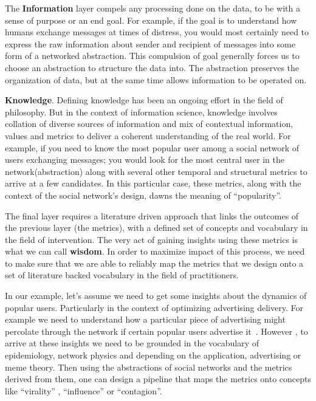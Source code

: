 The \textbf{Information} layer compels any processing done on the data, to be with a sense of purpose or an end goal. For example, if the goal is to understand how humans exchange messages at times of distress, you would most certainly need to express the raw information about sender and recipient of messages into some form of a networked abstraction. This compulsion of goal generally forces us to choose an abstraction to structure the data into. The abstraction preserves the organization of data, but at the same time allows information to be operated on.  

\textbf{Knowledge}. Defining knowledge has been an ongoing effort in the field of philosophy. But in the context of information science, knowledge involves collation of diverse sources of information and mix of contextual information, values and metrics to deliver a coherent understanding of the real world. For example, if you need to know the most popular user among a social network of users exchanging messages; you would look for the most central user in the network(abstraction) along with several other temporal and structural metrics to arrive at a few candidates. In this particular case, these metrics, along with the context of the social network's design, dawns the meaning of ``popularity''. 

The final layer requires a literature driven approach that links the outcomes of the previous layer (the metrics), with a defined set of concepts and vocabulary in the field of intervention. The very act of gaining insights using these metrics is what we can call \textbf{wisdom}. In order to maximize impact of this process, we need to make sure that we are able to reliably map the metrics that we design onto a set of literature backed vocabulary in the field of practitioners.

In our example, let's assume we need to get some insights about the dynamics of popular users. Particularly in the context of optimizing advertising delivery. For example we need to understand how a particular piece of advertising might percolate through the network if certain popular users advertise it~\cite{li2012diffusion}. However , to arrive at these insights we need to be grounded in the vocabulary of epidemiology, network physics and depending on the application, advertising or meme theory. Then using the abstractions of social networks and the metrics derived from them, one can design a pipeline that maps the metrics onto concepts like ``virality'' , ``influence'' or ``contagion''. 

